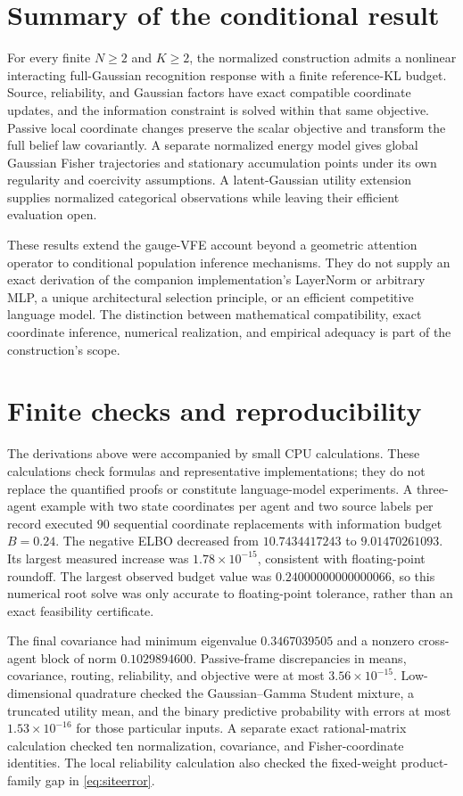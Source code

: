 \documentclass[11pt]{article}
\begin{document}
\section{Summary of the conditional result}

For every finite $N\ge2$ and $K\ge2$, the normalized construction admits a nonlinear interacting full-Gaussian recognition response with a finite reference-KL budget. Source, reliability, and Gaussian factors have exact compatible coordinate updates, and the information constraint is solved within that same objective. Passive local coordinate changes preserve the scalar objective and transform the full belief law covariantly. A separate normalized energy model gives global Gaussian Fisher trajectories and stationary accumulation points under its own regularity and coercivity assumptions. A latent-Gaussian utility extension supplies normalized categorical observations while leaving their efficient evaluation open.

These results extend the gauge-VFE account beyond a geometric attention operator to conditional population inference mechanisms. They do not supply an exact derivation of the companion implementation's LayerNorm or arbitrary MLP, a unique architectural selection principle, or an efficient competitive language model. The distinction between mathematical compatibility, exact coordinate inference, numerical realization, and empirical adequacy is part of the construction's scope.

\appendix
\section{Finite checks and reproducibility}
\label{app:checks}

The derivations above were accompanied by small CPU calculations. These calculations check formulas and representative implementations; they do not replace the quantified proofs or constitute language-model experiments. A three-agent example with two state coordinates per agent and two source labels per record executed $90$ sequential coordinate replacements with information budget $B=0.24$. The negative ELBO decreased from $10.7434417243$ to $9.01470261093$. Its largest measured increase was $1.78\times10^{-15}$, consistent with floating-point roundoff. The largest observed budget value was $0.24000000000000066$, so this numerical root solve was only accurate to floating-point tolerance, rather than an exact feasibility certificate.

The final covariance had minimum eigenvalue $0.3467039505$ and a nonzero cross-agent block of norm $0.1029894600$. Passive-frame discrepancies in means, covariance, routing, reliability, and objective were at most $3.56\times10^{-15}$. Low-dimensional quadrature checked the Gaussian--Gamma Student mixture, a truncated utility mean, and the binary predictive probability with errors at most $1.53\times10^{-16}$ for those particular inputs. A separate exact rational-matrix calculation checked ten normalization, covariance, and Fisher-coordinate identities. The local reliability calculation also checked the fixed-weight product-family gap in \eqref{eq:siteerror}.
\end{document}
